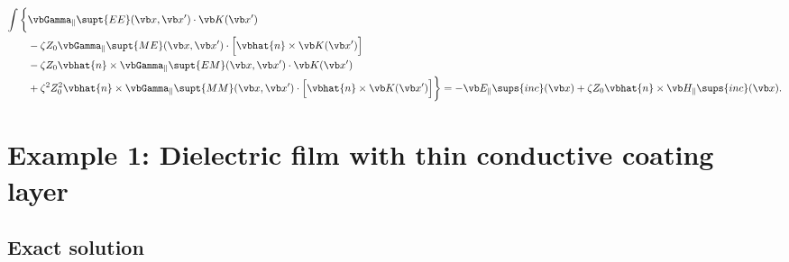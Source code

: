 \documentclass{article}
\newcommand{\BG}{\vbGamma}
\begin{document}
\begin{enumerate}
\begin{align*}
       \int\bigg\{ &\BG_{\parallel}\supt{EE}(\vb x, \vb x^\prime) 
                   \cdot \vb K(\vb x^\prime)
                   \\
                   &-\zeta Z_0\BG_{\parallel}\supt{ME}(\vb x, \vb x^\prime)
                   \cdot \Big[\vbhat{n}\times \vb K(\vb x^\prime)\Big] 
                   \\
                   &-\zeta Z_0\vbhat{n}\times \BG_{\parallel}\supt{EM}(\vb x, \vb x^\prime) 
                   \cdot \vb K(\vb x^\prime)
                   \\
                   &+\zeta^2 Z_0^2
                   \vbhat{n}\times\BG_{\parallel}\supt{MM}(\vb x, \vb x^\prime)
                   \cdot \Big[\vbhat{n}\times \vb K(\vb x^\prime)\Big]
       \bigg\}
       = -\vb E_{\parallel}\sups{inc}(\vb x) 
            +\zeta Z_0 \vbhat{n}\times \vb H_{\parallel}\sups{inc}(\vb x).
       \end{align*}
\end{enumerate}

\newpage
\section{Example 1: Dielectric film with thin conductive coating layer}

\subsection{Exact solution}
\end{document}
